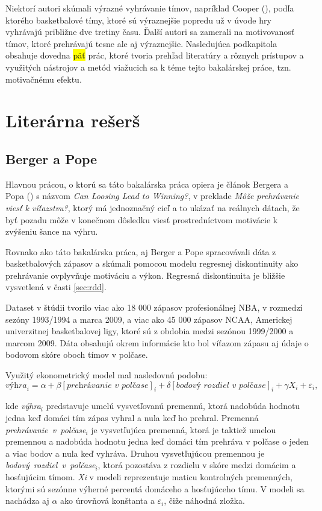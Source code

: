 \documentclass[
  digital, %
  twoside, %
  notable,   %
  lof,     %
  lot,     %
]{fithesis3}
\begin{document}
		Niektorí autori skúmali výrazné vyhrávanie tímov, napríklad Cooper (\citeyear{cooper1992}), podľa ktorého basketbalové tímy, ktoré sú výraznejšie popredu už v úvode hry vyhrávajú približne dve tretiny času. Ďalší autori sa zamerali na motivovanosť tímov, ktoré prehrávajú tesne ale aj výraznejšie. Nasledujúca podkapitola obsahuje dovedna \colorbox{yellow}{päť} prác, ktoré tvoria prehľad literatúry a rôznych prístupov a využitých nástrojov a metód viažucich sa k téme tejto bakalárskej práce, tzn. motivačnému efektu.
		
		\section{Literárna rešerš}
		\subsection{Berger a Pope}
		\label{sec:Berger}
		Hlavnou prácou, o ktorú sa táto bakalárska práca opiera je článok Bergera a Popa (\citeyear{berger2011}) s názvom \textit{Can Loosing Lead to Winning?}, v preklade \textit{Môže prehrávanie viesť k víťazstvu?}, ktorý má jednoznačný cieľ a to ukázať na reálnych dátach, že byť pozadu môže v konečnom dôsledku viesť prostredníctvom motivácie k zvýšeniu šance na výhru.
		
		Rovnako ako táto bakalárska práca, aj Berger a Pope spracovávali dáta z basketbalových zápasov a skúmali pomocou modelu regresnej diskontinuity ako prehrávanie ovplyvňuje motiváciu a výkon. Regresná diskontinuita je bližšie vysvetlená v časti \ref{sec:rdd}.
		
		Dataset v štúdii tvorilo viac ako 18 000 zápasov profesionálnej NBA, v rozmedzí sezóny 1993/1994 a marca 2009, a viac ako 45 000 zápasov NCAA, Americkej univerzitnej basketbalovej ligy, ktoré sú z obdobia medzi sezónou 1999/2000 a marcom 2009. \parencite[s.~818]{berger2011} Dáta obsahujú okrem informácie kto bol víťazom zápasu aj údaje o bodovom skóre oboch tímov v polčase.
		
		Využitý ekonometrický model mal nasledovnú podobu:
		\begin{equation}
		\label{eq:bp}
		\textit{výhra}_{i} = \alpha + \beta [\textit{prehrávanie~v~polčase}]_{i} + \delta [\textit{bodový~rozdiel~v~polčase}]_{i} + \gamma X_{i} + \varepsilon_{i},
		\end{equation}
		
		kde \textit{výhra$_{i}$} predstavuje umelú vysvetľovanú premennú, ktorá nadobúda hodnotu jedna keď domáci tím zápas vyhral a nula keď ho prehral. Premenná \textit{prehrávanie~v~polčase$ _{i} $} je vysvetľujúca premenná, ktorá je taktiež umelou premennou a nadobúda hodnotu jedna keď domáci tím prehráva v polčase o jeden a viac bodov a nula keď vyhráva. Druhou vysvetľujúcou premennou je \textit{bodový~rozdiel~v~polčase$ _{i} $}, ktorá pozostáva z rozdielu v skóre medzi domácim a hosťujúcim tímom. \textit{Xi} v modeli reprezentuje maticu kontrolných premenných, ktorými sú sezónne výherné percentá domáceho a hosťujúceho tímu.  V modeli sa nachádza aj $\alpha$ ako úrovňová konštanta a $\varepsilon_{i}$, čiže náhodná zložka.
		
\end{document}
